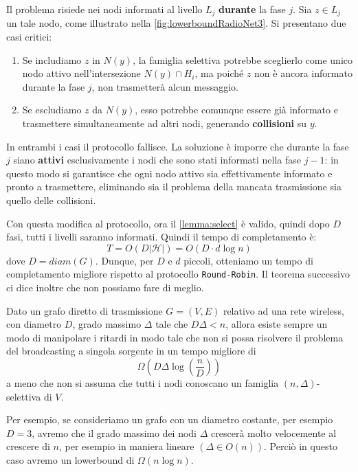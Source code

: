 Il problema risiede nei nodi informati al livello $L_j$ \textbf{durante} la fase $j$. Sia $z \in L_j$ un tale nodo, come illustrato nella \autoref{fig:lowerboundRadioNet3}. Si presentano due casi critici:

\begin{enumerate}
\item Se includiamo $z$ in $N(y)$, la famiglia selettiva potrebbe sceglierlo come unico nodo attivo nell'intersezione $N(y) \cap H_i$, ma poiché $z$ non è ancora informato durante la fase $j$, non trasmetterà alcun messaggio.
\item Se escludiamo $z$ da $N(y)$, esso potrebbe comunque essere già informato e trasmettere simultaneamente ad altri nodi, generando \textbf{collisioni} su $y$.
\end{enumerate}

In entrambi i casi il protocollo fallisce. La soluzione è imporre che durante la fase $j$ siano \textbf{attivi} esclusivamente i nodi che sono stati informati nella fase $j-1$: in questo modo si garantisce che ogni nodo attivo sia effettivamente informato e pronto a trasmettere, eliminando sia il problema della mancata trasmissione sia quello delle collisioni.

Con questa modifica al protocollo, ora il \autoref{lemma:select} è valido, quindi dopo $D$ fasi, tutti i livelli saranno informati. Quindi il tempo di completamento è:
\[
    T = O(D |\mathcal{H}|) = O(D \cdot d \log n)
\]
dove $D = diam(G)$. Dunque, per $D$ e $d$ piccoli, otteniamo un tempo di completamento migliore rispetto al protocollo \texttt{Round-Robin}. Il teorema successivo ci dice inoltre che non possiamo fare di meglio.

\begin{teorema}
    Dato un grafo diretto di trasmissione $G=(V,E)$ relativo ad una rete wireless, con diametro $D$, grado massimo $\Delta$ tale che $D\Delta < n$, allora esiste sempre un modo di manipolare i ritardi in modo tale che non si possa risolvere il problema del broadcasting a singola sorgente in un tempo migliore di
    \[
        \Omega(D\Delta \log\left(\frac{n}{D}\right))
    \]
a meno che non si assuma che tutti i nodi conoscano un famiglia $(n,\Delta)$-selettiva di $V$.
\end{teorema}

Per esempio, se consideriamo un grafo con un diametro costante, per esempio $D=3$, avremo che il grado massimo dei nodi $\Delta$ crescerà molto velocemente al crescere di $n$, per esempio in maniera lineare $(\Delta \in O(n))$. Perciò in questo caso avremo un lowerbound di $\Omega(n \log n)$.

